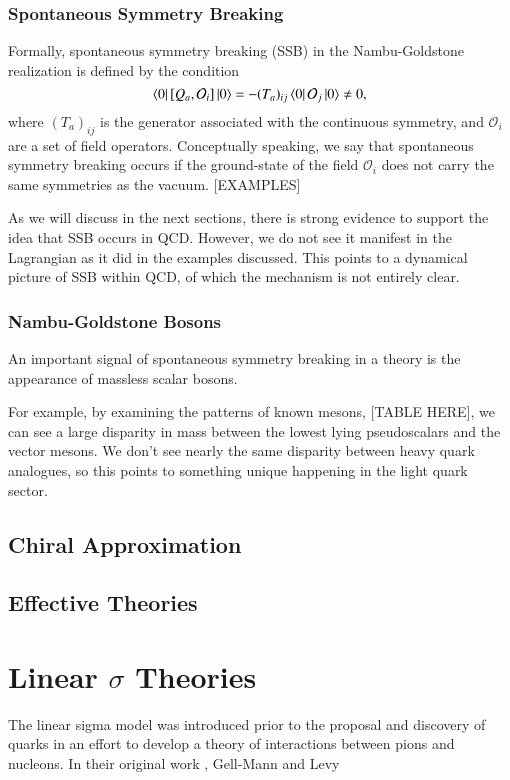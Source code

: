 \documentclass[aps,prd,onecolumn,showpacs,amsmath,amssymb,nofootinbib]{revtex4} \pdfoutput=1
\begin{document}
\subsubsection{Spontaneous Symmetry Breaking}
Formally, spontaneous symmetry breaking (SSB) in the Nambu-Goldstone realization is defined by the condition
\begin{equation}\label{eq:ssb}
    \bra{0} \left[ Q_{a},\mathcal{O}_{i}\right]\ket{0} = -(T_{a})_{ij}\bra{0}\mathcal{O}_{j}\ket{0}\neq 0,
\end{equation}
where $(T_{a})_{ij}$ is the generator associated with the continuous symmetry, and $\mathcal{O}_i$ are a set of field operators. Conceptually speaking, we say that spontaneous symmetry breaking occurs if the ground-state of the field $\mathcal{O}_{i}$ does not carry the same symmetries as the vacuum.
[EXAMPLES]

As we will discuss in the next sections, there is strong evidence to support the idea that SSB occurs in QCD. However, we do not see it manifest in the Lagrangian as it did in the examples discussed. This points to a dynamical picture of SSB within QCD, of which the mechanism is not entirely clear. 
\subsubsection{Nambu-Goldstone Bosons}
An important signal of spontaneous symmetry breaking in a theory is the appearance of massless scalar bosons.

For example, by examining the patterns of known mesons, [TABLE HERE], we can see a large disparity in mass between the lowest lying pseudoscalars and the vector mesons. 
We don't see nearly the same disparity between heavy quark analogues, so this points to something unique happening in the light quark sector.

\subsection{Chiral Approximation}
\subsection{Effective Theories}

\section{Linear $\sigma$ Theories}\label{IV}

The linear sigma model was introduced prior to the proposal and discovery of quarks in an effort to develop a theory of interactions between pions and nucleons. In their original work \cite{GellMann1960}, Gell-Mann and Levy
\end{document}
